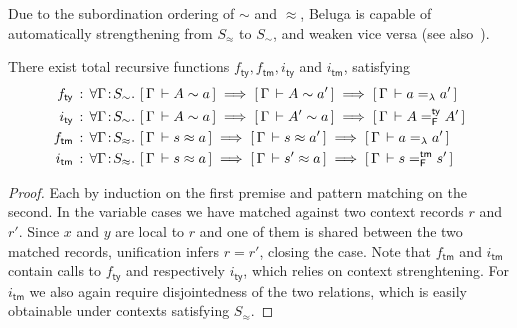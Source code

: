 \documentclass[a4paper,UKenglish]{lipics-v2016}
\newcommand{\ms}{\,}
\newcommand{\mrel}[1]{\mathrel{\ms #1 \ms}}
\newcommand{\OF}{\mrel{:}}
\newcommand{\mAll}[1]{\ensuremath{\forall} #1.\ms\ms}
\newcommand{\ty}{\mathsf{ty}}
\newcommand{\tm}{\mathsf{tm}}
\newcommand{\of}{\ensuremath{\!:\!}}
\newcommand{\tyr}{\mathrel{\sim}}
\newcommand{\tmr}{\mathrel{\approx}}
\theoremstyle{plain}
\begin{document}
Due to the subordination ordering of $\tyr$ and $\tmr$, Beluga is capable of automatically strengthening from $S_{\tmr}$ to $S_{\tyr}$, and weaken vice versa (see also~\cite{Virga99phd}).
\begin{lemma}
  There exist total recursive functions $f_{\ty}, f_{\tm}, i_{\ty}$ and $i_{\tm}$, satisfying
  \begin{align*}
    f_{\ty} &\OF  \mAll{\Gamma \of S_{\tyr}} \bc{\Gamma}{A \tyr a} \implies \bc{\Gamma}{A \tyr a'} \implies \bc{\Gamma}{a =_{\lambda} a'}\\
    i_{\ty} &\OF  \mAll{\Gamma \of S_{\tyr}} \bc{\Gamma}{A \tyr a} \implies \bc{\Gamma}{A' \tyr a} \implies \bc{\Gamma}{A =^{\ty}_{\mathsf{F}} A'}\\
    f_{\tm} &\OF  \mAll{\Gamma \of S_{\tmr}} \bc{\Gamma}{s \tmr a} \implies \bc{\Gamma}{s \tmr a'} \implies \bc{\Gamma}{a =_{\lambda} a'}\\
    i_{\tm} &\OF  \mAll{\Gamma \of S_{\tmr}} \bc{\Gamma}{s \tmr a} \implies \bc{\Gamma}{s' \tmr a} \implies \bc{\Gamma}{s =^{\tm}_{\mathsf{F}} s'}
\end{align*}
\end{lemma}
\begin{proof}
  Each by induction on the first premise and pattern matching on the second.
  In the variable cases we have matched against two context records $r$ and $r'$.
  Since $x$ and $y$ are local to $r$ and one of them is shared between the two matched records, unification infers $r = r'$, closing the case.
  Note that $f_{\tm}$ and $i_{\tm}$ contain calls to $f_{\ty}$ and respectively $i_{\ty}$, which relies on context strenghtening.
  For $i_{\tm}$ we also again require disjointedness of the two relations, which is easily obtainable under contexts satisfying $S_{\tmr}$.
\end{proof}
\end{document}

